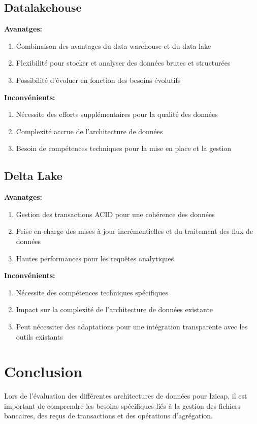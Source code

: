\subsection{Datalakehouse}
\textbf{Avanatges:}
\begin{enumerate}
    \item Combinaison des avantages du data warehouse et du data lake
    \item Flexibilité pour stocker et analyser des données brutes et structurées
    \item Possibilité d'évoluer en fonction des besoins évolutifs
\end{enumerate}

\textbf{Inconvénients:}
\begin{enumerate}
    \item Nécessite des efforts supplémentaires pour la qualité des données
    \item Complexité accrue de l'architecture de données
    \item Besoin de compétences techniques pour la mise en place et la gestion
\end{enumerate}

\subsection{Delta Lake}
\textbf{Avanatges:}
\begin{enumerate}
    \item Gestion des transactions ACID pour une cohérence des données
    \item Prise en charge des mises à jour incrémentielles et du traitement des flux de données
    \item Hautes performances pour les requêtes analytiques
\end{enumerate}

\textbf{Inconvénients:}
\begin{enumerate}
    \item Nécessite des compétences techniques spécifiques
    \item Impact sur la complexité de l'architecture de données existante
    \item Peut nécessiter des adaptations pour une intégration transparente avec les outils existants
\end{enumerate}

\section*{Conclusion}
Lors de l'évaluation des différentes architectures de données pour Izicap, il est important de comprendre les besoins spécifiques liés à la gestion des fichiers bancaires, des reçus de transactions et des opérations d'agrégation.

